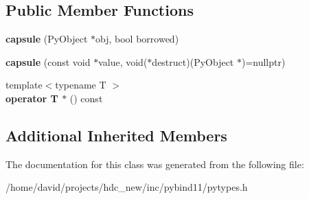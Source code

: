 \subsection*{Public Member Functions}
\begin{DoxyCompactItemize}
\item 
{\bfseries capsule} (Py\+Object $\ast$obj, bool borrowed)\hypertarget{classcapsule_a5fa1f7e93c6877153f4de55ddc5cb42f}{}\label{classcapsule_a5fa1f7e93c6877153f4de55ddc5cb42f}

\item 
{\bfseries capsule} (const void $\ast$value, void($\ast$destruct)(Py\+Object $\ast$)=nullptr)\hypertarget{classcapsule_add82dfad95c9eaf9230ead2663faa73a}{}\label{classcapsule_add82dfad95c9eaf9230ead2663faa73a}

\item 
{\footnotesize template$<$typename T $>$ }\\{\bfseries operator T $\ast$} () const \hypertarget{classcapsule_a4e61c37479d527d1d874715be308dcd9}{}\label{classcapsule_a4e61c37479d527d1d874715be308dcd9}

\end{DoxyCompactItemize}
\subsection*{Additional Inherited Members}


The documentation for this class was generated from the following file\+:\begin{DoxyCompactItemize}
\item 
/home/david/projects/hdc\+\_\+new/inc/pybind11/pytypes.\+h\end{DoxyCompactItemize}

